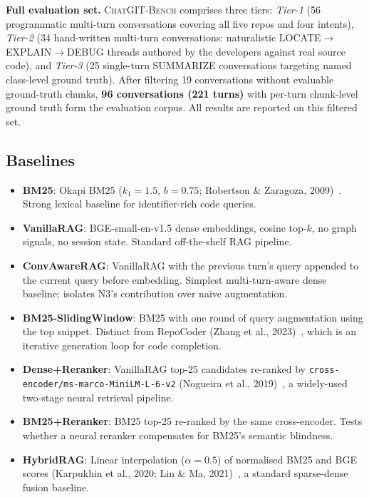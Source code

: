 \documentclass[runningheads]{llncs}
\newcommand{\conv}{\textsc{ChatGIT-Bench}\xspace}
\begin{document}
\textbf{Full evaluation set.} \conv comprises three tiers:
\emph{Tier-1} (56 programmatic multi-turn conversations covering
all five repos and four intents), \emph{Tier-2} (34 hand-written
multi-turn conversations: naturalistic LOCATE$\to$EXPLAIN$\to$DEBUG
threads authored by the developers against real source code), and
\emph{Tier-3} (25 single-turn SUMMARIZE conversations targeting
named class-level ground truth). After filtering 19 conversations
without evaluable ground-truth chunks, \textbf{96 conversations
(221 turns)} with per-turn chunk-level ground truth form the
evaluation corpus. All results are reported on this filtered set.

\subsection{Baselines}

\begin{itemize}[leftmargin=*]
  \item \textbf{BM25}: Okapi BM25 ($k_1{=}1.5$, $b{=}0.75$;
        Robertson \& Zaragoza, 2009)~\cite{robertson2009bm25}.
        Strong lexical baseline for identifier-rich code queries.
  \item \textbf{VanillaRAG}: BGE-small-en-v1.5 dense embeddings,
        cosine top-$k$, no graph signals, no session state.
        Standard off-the-shelf RAG pipeline.
  \item \textbf{ConvAwareRAG}: VanillaRAG with the previous turn's
        query appended to the current query before embedding.
        Simplest multi-turn-aware dense baseline; isolates N3's
        contribution over naive augmentation.
  \item \textbf{BM25-SlidingWindow}: BM25 with one round of
        query augmentation using the top snippet. Distinct from
        RepoCoder (Zhang et al., 2023)~\cite{zhang2023repocoder},
        which is an iterative generation loop for code completion.
  \item \textbf{Dense+Reranker}: VanillaRAG top-25 candidates
        re-ranked by \texttt{cross-encoder/ms-marco-MiniLM-L-6-v2}
        (Nogueira et al., 2019)~\cite{nogueira2019passage},
        a widely-used two-stage neural retrieval pipeline.
  \item \textbf{BM25+Reranker}: BM25 top-25 re-ranked by the
        same cross-encoder. Tests whether a neural reranker
        compensates for BM25's semantic blindness.
  \item \textbf{HybridRAG}: Linear interpolation ($\alpha{=}0.5$)
        of normalised BM25 and BGE scores (Karpukhin et al.,
        2020; Lin \& Ma, 2021)~\cite{karpukhin2020dense,lin2021few},
        a standard sparse-dense fusion baseline.
\end{itemize}
\end{document}
